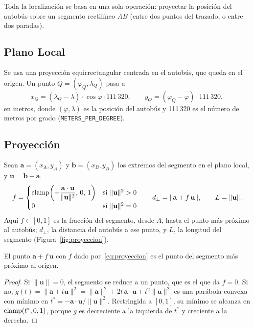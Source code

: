Toda la localización se basa en una sola operación: proyectar la posición del autobús sobre un segmento rectilíneo $AB$
(entre dos puntos del trazado, o entre dos paradas).

\subsection{Plano Local} Se usa una proyección equirrectangular centrada en el autobús, que queda en el origen. Un
punto $Q=(\varphi_Q,\lambda_Q)$ pasa a
\begin{equation}
\label{eq:plano}
x_Q=(\lambda_Q-\lambda)\cdot\cos\varphi\cdot 111\,320,\qquad y_Q=(\varphi_Q-\varphi)\cdot 111\,320,
\end{equation}
en metros, donde $(\varphi,\lambda)$ es la posición del autobús y 111\,320 es el número de metros por grado
(\texttt{METERS\_PER\_DEGREE}).

\subsection{Proyección} Sean $\mathbf{a}=(x_A,y_A)$ y $\mathbf{b}=(x_B,y_B)$ los extremos del segmento en el plano
local, y $\mathbf{u}=\mathbf{b}-\mathbf{a}$.
\begin{equation}
\label{eq:proyeccion}
f=\begin{cases}\operatorname{clamp}\!\left(-\dfrac{\mathbf{a}\cdot\mathbf{u}}{\|\mathbf{u}\|^2},\,0,\,1\right) & \text{si } \|\mathbf{u}\|^2>0\\[1ex]
0 & \text{si } \|\mathbf{u}\|^2=0\end{cases}
\qquad
d_\perp=\|\mathbf{a}+f\,\mathbf{u}\|,\qquad L=\|\mathbf{u}\|.
\end{equation}
Aquí $f\in[0,1]$ es la fracción del segmento, desde $A$, hasta el punto más próximo al autobús; $d_\perp$, la distancia
del autobús a ese punto, y $L$, la longitud del segmento (Figura~\ref{fig:proyeccion}).

\begin{proposicion}
El punto $\mathbf{a}+f\,\mathbf{u}$ con $f$ dado por~\eqref{eq:proyeccion} es el punto del segmento más próximo al
origen.
\end{proposicion}
\begin{proof}
Si $\|\mathbf{u}\|=0$, el segmento se reduce a un punto, que es el que da $f=0$. Si no, $g(t)=\|\mathbf{a}+t\mathbf{u}\|^2=\|\mathbf{a}\|^2+2t\,
\mathbf{a}\cdot\mathbf{u}+t^2\|\mathbf{u}\|^2$ es una parábola convexa con mínimo en
$t^\ast=-\mathbf{a}\cdot\mathbf{u}/\|\mathbf{u}\|^2$. Restringida a $[0,1]$, su mínimo se alcanza en $\operatorname{clamp}(t^\ast,0,1)$, porque
$g$ es decreciente a la izquierda de $t^\ast$ y creciente a la derecha.
\end{proof}

